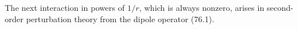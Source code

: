 The next interaction in powers of $1/r$, which is always nonzero, arises in second-order perturbation theory from the dipole operator (76.1).
